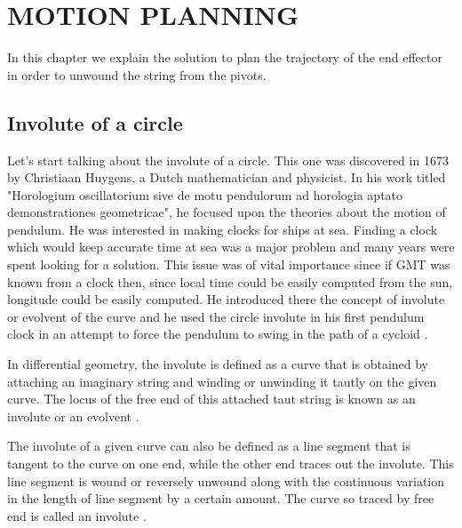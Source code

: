 \chapter{MOTION PLANNING}
\label{ch:Motion planning}
In this chapter we explain the solution to plan the trajectory of the end effector in order to unwound the string from the pivots.

\section{Involute of a circle}
Let's start talking about the involute of a circle. This one was discovered in 1673 by Christiaan Huygens, a Dutch mathematician and physicist. In his work titled "Horologium oscillatorium sive de motu pendulorum ad horologia aptato demonstrationes geometricae", he focused upon the theories about the motion of pendulum. He was interested in making clocks for ships at sea. Finding a clock which would keep accurate time at sea was a major problem and many years were spent looking for a solution. This issue was of vital importance since if GMT was known from a clock then, since local time could be easily computed from the sun, longitude could be easily computed.  He introduced there the concept of involute or evolvent of the curve and he used the circle involute in his first pendulum clock in an attempt to force the pendulum to swing in the path of a cycloid \cite{mccleary2013geometry}. 


In differential geometry, the involute is defined as a curve that is obtained by attaching an imaginary string and winding or unwinding it tautly on the given curve. The locus of the free end of this attached taut string is known as an involute or an evolvent  \cite{mccleary2013geometry}.

The involute of a given curve can also be defined as a line segment that is tangent to the curve on one end, while the other end traces out the involute. This line segment is wound or reversely unwound along with the continuous variation in the length of line segment by a certain amount. The curve so traced by free end is called an involute  \cite{mccleary2013geometry}.

